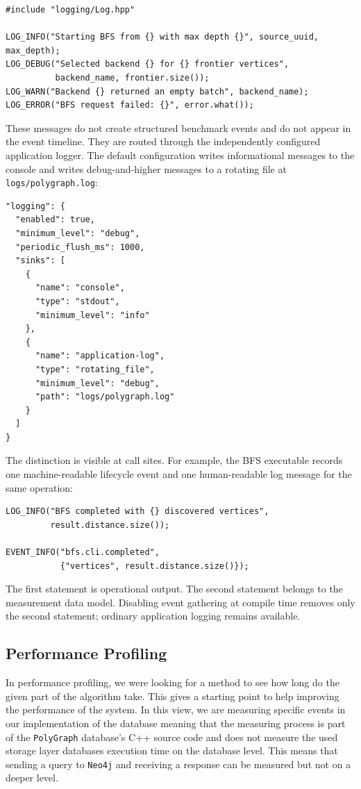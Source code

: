 \documentclass[11pt,a4paper]{article}
\begin{document}
\begin{lstlisting}[style=cpp]
#include "logging/Log.hpp"

LOG_INFO("Starting BFS from {} with max depth {}", source_uuid, max_depth);
LOG_DEBUG("Selected backend {} for {} frontier vertices",
          backend_name, frontier.size());
LOG_WARN("Backend {} returned an empty batch", backend_name);
LOG_ERROR("BFS request failed: {}", error.what());
\end{lstlisting}

These messages do not create structured benchmark events and do not appear in the
event timeline. They are routed through the independently configured application
logger. The default configuration writes informational messages to the console and
writes debug-and-higher messages to a rotating file at
\texttt{logs/polygraph.log}:

\begin{lstlisting}[style=json]
"logging": {
  "enabled": true,
  "minimum_level": "debug",
  "periodic_flush_ms": 1000,
  "sinks": [
    {
      "name": "console",
      "type": "stdout",
      "minimum_level": "info"
    },
    {
      "name": "application-log",
      "type": "rotating_file",
      "minimum_level": "debug",
      "path": "logs/polygraph.log"
    }
  ]
}
\end{lstlisting}

The distinction is visible at call sites. For example, the BFS executable records
one machine-readable lifecycle event and one human-readable log message for the
same operation:

\begin{lstlisting}[style=cpp]
LOG_INFO("BFS completed with {} discovered vertices",
         result.distance.size());

EVENT_INFO("bfs.cli.completed",
           {"vertices", result.distance.size()});
\end{lstlisting}

The first statement is operational output. The second statement belongs to the
measurement data model. Disabling event gathering at compile time removes only the
second statement; ordinary application logging remains available.


\subsection{Performance Profiling}

In performance profiling, we were looking for a method to see how long do the given part of the algorithm take. This gives a starting point to help improving the performance of the system. In this view, we are measuring specific events in our implementation of the database meaning that the measuring process is part of the \texttt{PolyGraph} database's C++ source code and does not measure the used storage layer databases execution time on the database level. This means that sending a query to \texttt{Neo4j}  and receiving a response can be measured but not on a deeper level.
\end{document}
